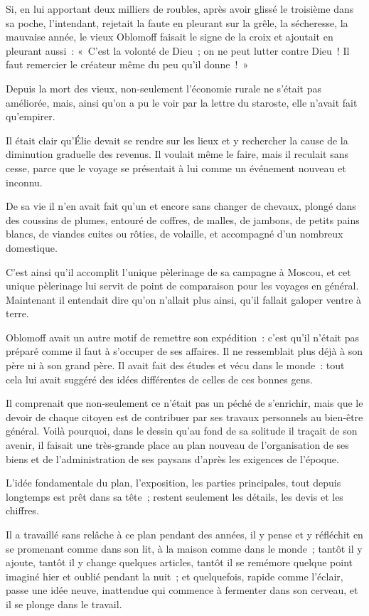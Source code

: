 \documentclass[french,twoside]{book} %
\begin{document}
Si, en lui apportant deux milliers de roubles, après avoir glissé le troisième dans sa poche, l’intendant, rejetait la faute en pleurant sur la grêle, la sécheresse, la mauvaise année, le vieux Oblomoff faisait le signe de la croix et ajoutait en pleurant aussi : « C’est la volonté de Dieu ; on ne peut lutter contre Dieu ! Il faut remercier le créateur même du peu qu’il donne ! »\par
Depuis la mort des vieux, non-seulement l’économie rurale ne s’était pas améliorée, mais, ainsi qu’on a pu le voir par la lettre du staroste, elle n’avait fait qu’empirer.\par
Il était clair qu’Élie devait se rendre sur les lieux et y rechercher la cause de la diminution graduelle des revenus. Il voulait même le faire, mais il reculait sans cesse, parce que le voyage se présentait à lui comme un événement nouveau et inconnu.\par
De sa vie il n’en avait fait qu’un et encore sans changer de chevaux, plongé dans des coussins de plumes, entouré de coffres, de malles, de jambons, de petits pains blancs, de viandes cuites ou rôties, de volaille, et accompagné d’un nombreux domestique.\par
C’est ainsi qu’il accomplit l’unique pèlerinage de sa campagne à Moscou, et cet unique pèlerinage lui servit de point de comparaison pour les voyages en général. Maintenant il entendait dire qu’on n’allait plus ainsi, qu’il fallait galoper ventre à terre.\par
Oblomoff avait un autre motif de remettre son expédition : c’est qu’il n’était pas préparé comme il faut à s’occuper de ses affaires. Il ne ressemblait plus déjà à son père ni à son grand père. Il avait fait des études et vécu dans le monde : tout cela lui avait suggéré des idées différentes de celles de ces bonnes gens.\par
Il comprenait que non-seulement ce n’était pas un péché de s’enrichir, mais que le devoir de chaque citoyen est de contribuer par ses travaux personnels au bien-être général. Voilà pourquoi, dans le dessin qu’au fond de sa solitude il traçait de son avenir, il faisait une très-grande place au plan nouveau de l’organisation de ses biens et de l’administration de ses paysans d’après les exigences de l’époque.\par
L’idée fondamentale du plan, l’exposition, les parties principales, tout depuis longtemps est prêt dans sa tête ; restent seulement les détails, les devis et les chiffres.\par
Il a travaillé sans relâche à ce plan pendant des années, il y pense et y réfléchit en se promenant comme dans son lit, à la maison comme dans le monde ; tantôt il y ajoute, tantôt il y change quelques articles, tantôt il se remémore quelque point imaginé hier et oublié pendant la nuit ; et quelquefois, rapide comme l’éclair, passe une idée neuve, inattendue qui commence à fermenter dans son cerveau, et il se plonge dans le travail.\par
\end{document}
